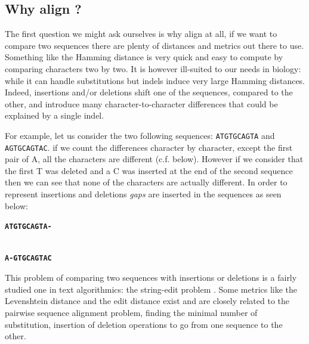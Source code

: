 \documentclass[
  11pt,
  twoside,
  BCOR=10mm,
  listof=totoc]{scrbook}
\begin{document}
\hypertarget{why-align}{%
\subsection{Why align ?}\label{why-align}}

The first question we might ask ourselves is why align at all, if we want to compare two sequences there are plenty of distances and metrics out there to use. Something like the Hamming distance \autocite{hammingCodingInformationTheory1980} is very quick and easy to compute by comparing characters two by two. It is however ill-suited to our needs in biology: while it can handle substitutions but indels induce very large Hamming distances. Indeed, insertions and/or deletions shift one of the sequences, compared to the other, and introduce many character-to-character differences that could be explained by a single indel.

For example, let us consider the two following sequences: \texttt{ATGTGCAGTA} and \texttt{AGTGCAGTAC}. if we count the differences character by character, except the first pair of A, all the characters are different (c.f. below). However if we consider that the first T was deleted and a C was inserted at the end of the second sequence then we can see that none of the characters are actually different. In order to represent insertions and deletions \emph{gaps} are inserted in the sequences as seen below:

\textbf{\texttt{ATGTGCAGTA-}}\strut \\
\textbf{\texttt{A-GTGCAGTAC}}

This problem of comparing two sequences with insertions or deletions is a fairly studied one in text algorithmics: the string-edit problem \autocite{gusfieldAlgorithmsStringsTrees1997}. Some metrics like the Levenshtein distance \autocite{levenshteinBinaryCodesCapable1966} and the edit distance \autocite{gusfieldAlgorithmsStringsTrees1997} exist and are closely related to the pairwise sequence alignment problem, finding the minimal number of substitution, insertion of deletion operations to go from one sequence to the other.
\end{document}
